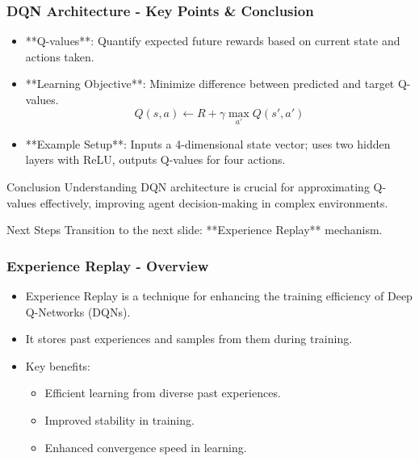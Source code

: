 \documentclass[aspectratio=169]{beamer}
\begin{document}
\begin{frame}[fragile]
    \frametitle{DQN Architecture - Key Points & Conclusion}
    \begin{itemize}
        \item **Q-values**: Quantify expected future rewards based on current state and actions taken.
        \item **Learning Objective**: Minimize difference between predicted and target Q-values.
        \[
        Q(s, a) \leftarrow R + \gamma \max_{a'} Q(s', a')
        \]
        \item **Example Setup**: Inputs a 4-dimensional state vector; uses two hidden layers with ReLU, outputs Q-values for four actions.
    \end{itemize}

    \begin{block}{Conclusion}
        Understanding DQN architecture is crucial for approximating Q-values effectively, improving agent decision-making in complex environments.
    \end{block}

    \begin{block}{Next Steps}
        Transition to the next slide: **Experience Replay** mechanism.
    \end{block}
\end{frame}

\begin{frame}[fragile]
    \frametitle{Experience Replay - Overview}
    \begin{itemize}
        \item Experience Replay is a technique for enhancing the training efficiency of Deep Q-Networks (DQNs).
        \item It stores past experiences and samples from them during training.
        \item Key benefits:
        \begin{itemize}
            \item Efficient learning from diverse past experiences.
            \item Improved stability in training.
            \item Enhanced convergence speed in learning.
        \end{itemize}
    \end{itemize}
\end{frame}
\end{document}
